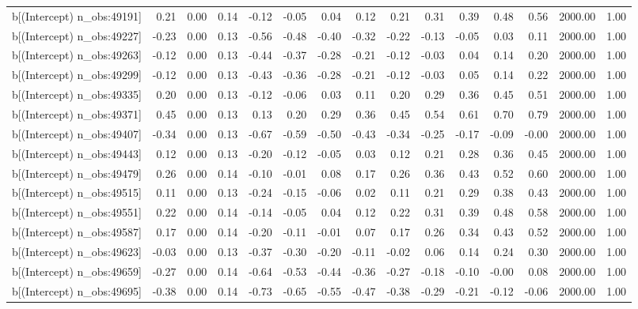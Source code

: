 \begin{table}[ht]
\begin{tabular}{rrrrrrrrrrrrrrr}
  b[(Intercept) n\_obs:49191] & 0.21 & 0.00 & 0.14 & -0.12 & -0.05 & 0.04 & 0.12 & 0.21 & 0.31 & 0.39 & 0.48 & 0.56 & 2000.00 & 1.00 \\ 
  b[(Intercept) n\_obs:49227] & -0.23 & 0.00 & 0.13 & -0.56 & -0.48 & -0.40 & -0.32 & -0.22 & -0.13 & -0.05 & 0.03 & 0.11 & 2000.00 & 1.00 \\ 
  b[(Intercept) n\_obs:49263] & -0.12 & 0.00 & 0.13 & -0.44 & -0.37 & -0.28 & -0.21 & -0.12 & -0.03 & 0.04 & 0.14 & 0.20 & 2000.00 & 1.00 \\ 
  b[(Intercept) n\_obs:49299] & -0.12 & 0.00 & 0.13 & -0.43 & -0.36 & -0.28 & -0.21 & -0.12 & -0.03 & 0.05 & 0.14 & 0.22 & 2000.00 & 1.00 \\ 
  b[(Intercept) n\_obs:49335] & 0.20 & 0.00 & 0.13 & -0.12 & -0.06 & 0.03 & 0.11 & 0.20 & 0.29 & 0.36 & 0.45 & 0.51 & 2000.00 & 1.00 \\ 
  b[(Intercept) n\_obs:49371] & 0.45 & 0.00 & 0.13 & 0.13 & 0.20 & 0.29 & 0.36 & 0.45 & 0.54 & 0.61 & 0.70 & 0.79 & 2000.00 & 1.00 \\ 
  b[(Intercept) n\_obs:49407] & -0.34 & 0.00 & 0.13 & -0.67 & -0.59 & -0.50 & -0.43 & -0.34 & -0.25 & -0.17 & -0.09 & -0.00 & 2000.00 & 1.00 \\ 
  b[(Intercept) n\_obs:49443] & 0.12 & 0.00 & 0.13 & -0.20 & -0.12 & -0.05 & 0.03 & 0.12 & 0.21 & 0.28 & 0.36 & 0.45 & 2000.00 & 1.00 \\ 
  b[(Intercept) n\_obs:49479] & 0.26 & 0.00 & 0.14 & -0.10 & -0.01 & 0.08 & 0.17 & 0.26 & 0.36 & 0.43 & 0.52 & 0.60 & 2000.00 & 1.00 \\ 
  b[(Intercept) n\_obs:49515] & 0.11 & 0.00 & 0.13 & -0.24 & -0.15 & -0.06 & 0.02 & 0.11 & 0.21 & 0.29 & 0.38 & 0.43 & 2000.00 & 1.00 \\ 
  b[(Intercept) n\_obs:49551] & 0.22 & 0.00 & 0.14 & -0.14 & -0.05 & 0.04 & 0.12 & 0.22 & 0.31 & 0.39 & 0.48 & 0.58 & 2000.00 & 1.00 \\ 
  b[(Intercept) n\_obs:49587] & 0.17 & 0.00 & 0.14 & -0.20 & -0.11 & -0.01 & 0.07 & 0.17 & 0.26 & 0.34 & 0.43 & 0.52 & 2000.00 & 1.00 \\ 
  b[(Intercept) n\_obs:49623] & -0.03 & 0.00 & 0.13 & -0.37 & -0.30 & -0.20 & -0.11 & -0.02 & 0.06 & 0.14 & 0.24 & 0.30 & 2000.00 & 1.00 \\ 
  b[(Intercept) n\_obs:49659] & -0.27 & 0.00 & 0.14 & -0.64 & -0.53 & -0.44 & -0.36 & -0.27 & -0.18 & -0.10 & -0.00 & 0.08 & 2000.00 & 1.00 \\ 
  b[(Intercept) n\_obs:49695] & -0.38 & 0.00 & 0.14 & -0.73 & -0.65 & -0.55 & -0.47 & -0.38 & -0.29 & -0.21 & -0.12 & -0.06 & 2000.00 & 1.00 \\ 

\end{tabular}
\end{table}
